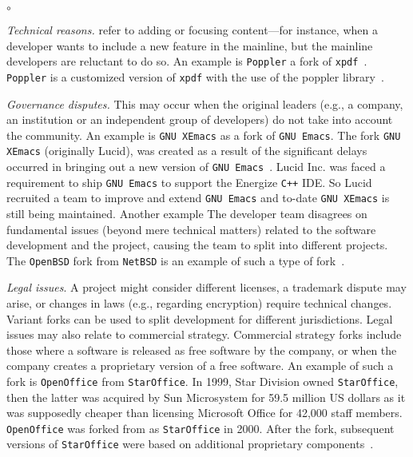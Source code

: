 \begin{list}{$\circ$}{}
   \item \textit{Technical reasons.} refer to adding or focusing content---for instance, when a developer wants to include a new feature in the mainline, but the mainline developers are reluctant to do so. An example is \texttt{Poppler} a fork of \texttt{xpdf}~\cite{Gregorio:2012}. \texttt{Poppler} is a customized version of \texttt{xpdf} with the use of the poppler library~\cite{poppler}.
    
    
    \item \textit{Governance disputes.} This may occur when the original leaders (e.g., a company, an institution or an independent group of developers) do not take into account the community. An example is \texttt{GNU XEmacs} as a fork of \texttt{GNU Emacs}.
    The fork \texttt{GNU XEmacs} (originally Lucid), was created as a result of the significant delays occurred in bringing out a new version of \texttt{GNU Emacs}~\cite{XEmacs}. Lucid Inc. was faced a requirement to ship \texttt{GNU Emacs} to support the Energize \texttt{C++} IDE. So Lucid recruited a team to improve and extend \texttt{GNU Emacs} and to-date \texttt{GNU XEmacs} is still being maintained. Another example The developer team disagrees on fundamental issues (beyond mere technical matters) related to the software development and the project, causing the team to split into different projects. The \texttt{OpenBSD} fork from \texttt{NetBSD} is an example of such a type of fork~\cite{openbsd}.




\item \textit{Legal issues}. A project might consider different licenses, a trademark dispute may arise, or changes in laws (e.g., regarding encryption) require technical changes. Variant forks can be used to split development for different jurisdictions. Legal issues may also relate to commercial strategy. Commercial strategy forks include those where a software is released as free software by the company, or when the company creates a proprietary version of a free software. An example of such a fork is \texttt{OpenOffice} from \texttt{StarOffice}. In 1999, Star Division owned \texttt{StarOffice}, then the latter was acquired by Sun Microsystem for 59.5 million US dollars as it was supposedly cheaper than licensing Microsoft Office for 42,000 staff members. \texttt{OpenOffice} was forked from as \texttt{StarOffice} in 2000. After the fork, subsequent versions of \texttt{StarOffice} were based on additional proprietary components~\cite{Openoffice}.


\end{list}
